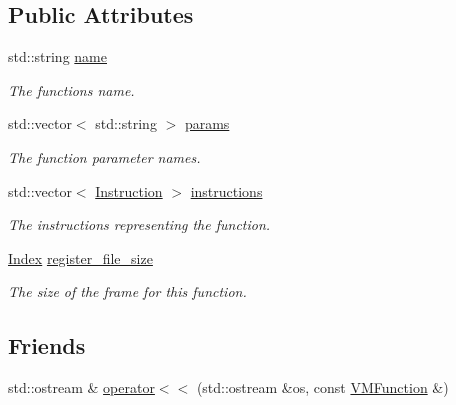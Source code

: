 \subsection*{Public Attributes}
\begin{DoxyCompactItemize}
\item 
std\+::string \hyperlink{structtvm_1_1runtime_1_1vm_1_1VMFunction_ae2f6bf699f51fb33d1659d88ff6855e0}{name}
\begin{DoxyCompactList}\small\item\em The function\textquotesingle{}s name. \end{DoxyCompactList}\item 
std\+::vector$<$ std\+::string $>$ \hyperlink{structtvm_1_1runtime_1_1vm_1_1VMFunction_a6d480483112097888c71501504665693}{params}
\begin{DoxyCompactList}\small\item\em The function parameter names. \end{DoxyCompactList}\item 
std\+::vector$<$ \hyperlink{structtvm_1_1runtime_1_1vm_1_1Instruction}{Instruction} $>$ \hyperlink{structtvm_1_1runtime_1_1vm_1_1VMFunction_a046985e3f5a2b4201298555514d5d356}{instructions}
\begin{DoxyCompactList}\small\item\em The instructions representing the function. \end{DoxyCompactList}\item 
\hyperlink{namespacetvm_1_1runtime_1_1vm_a3597867d2db714bf760876a23d6b7d3d}{Index} \hyperlink{structtvm_1_1runtime_1_1vm_1_1VMFunction_a5b910095e5c2826cf57793afb4f2078a}{register\+\_\+file\+\_\+size}
\begin{DoxyCompactList}\small\item\em The size of the frame for this function. \end{DoxyCompactList}\end{DoxyCompactItemize}
\subsection*{Friends}
\begin{DoxyCompactItemize}
\item 
std\+::ostream \& \hyperlink{structtvm_1_1runtime_1_1vm_1_1VMFunction_a4dd5eae76553d1be115e71f38775e3fc}{operator$<$$<$} (std\+::ostream \&os, const \hyperlink{structtvm_1_1runtime_1_1vm_1_1VMFunction}{V\+M\+Function} \&)
\end{DoxyCompactItemize}


